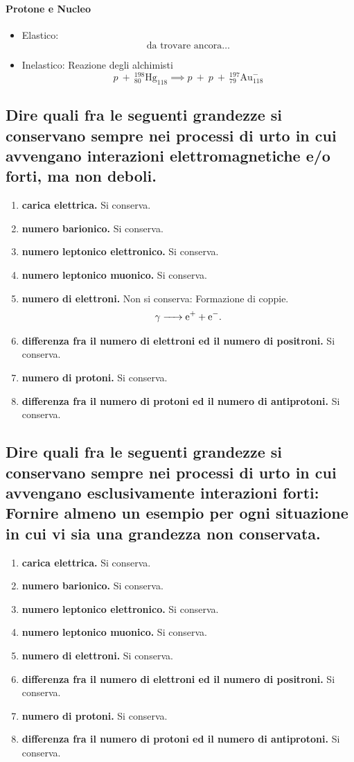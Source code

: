 \paragraph{Protone e Nucleo}
\begin{itemize}
	\item Elastico: 
	\[
		\text{da trovare ancora\ldots}
	\]
	\item Inelastico: Reazione degli alchimisti
	\[
		p \ + \ {}^{198}_{80}\text{Hg}_{118} \implies p \ + \ p \ + \ {}^{197}_{79}\text{Au}^{-}_{118} 
	\] 
\end{itemize}
\subsection[]{ Dire quali fra le seguenti grandezze si conservano sempre nei processi di urto in cui avvengano interazioni elettromagnetiche e/o forti, ma non deboli.} 
\begin{enumerate}
	\item \textbf{carica elettrica.} Si conserva.
	\item \textbf{numero barionico.} Si conserva.
	\item \textbf{numero leptonico elettronico.} Si conserva. 
	\item \textbf{numero leptonico muonico.} Si conserva.
	\item \textbf{numero di elettroni.} Non si conserva: Formazione di coppie.
		\[
			\ce{ \ce{\gamma} -> \ce{e^+} + \ce{e^-}}
		.\]  
	\item \textbf{differenza fra il numero di elettroni ed il numero di positroni.} Si conserva.
	\item \textbf{numero di protoni.} Si conserva.
	\item \textbf{differenza fra il numero di protoni ed il numero di antiprotoni.} Si conserva.
\end{enumerate}


\subsection[]{ Dire quali fra le seguenti grandezze si conservano sempre nei processi di urto in cui avvengano esclusivamente interazioni forti:  Fornire almeno un esempio per ogni situazione in cui vi sia una grandezza non conservata.}
\begin{enumerate}
	\item \textbf{carica elettrica.} Si conserva.
	\item \textbf{numero barionico.} Si conserva.
	\item \textbf{numero leptonico elettronico.} Si conserva.
	\item \textbf{numero leptonico muonico.} Si conserva.
	\item \textbf{numero di elettroni.} Si conserva.
	\item \textbf{differenza fra il numero di elettroni ed il numero di positroni.} Si conserva.  
	\item \textbf{numero di protoni.} Si conserva.
	\item \textbf{differenza fra il numero di protoni ed il numero di antiprotoni.} Si conserva.
\end{enumerate}


